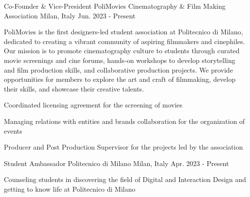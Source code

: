 

\begin{cventries}

    \cventry
      {Co-Founder \& Vice-President} %
      {PoliMovies Cinematography \& Film Making Association} %
      {Milan, Italy} %
      {Jun. 2023 - Present} %
      {
        \begin{cvitems} %
          {PoliMovies is the first designers-led student association at Politecnico di Milano, \\dedicated to creating a vibrant community of aspiring filmmakers and cinephiles. \\Our mission is to promote cinematography culture to students through curated movie screenings and cine forums, hands-on workshops to develop storytelling and film production skills, and collaborative production projects. We provide opportunities for members to explore the art and craft of filmmaking, develop their skills, and showcase their creative talents.}
          \item {}
          \item {Coordinated licensing agreement for the screening of movies}
          \item {Managing relations with entities and brands collaboration for the organization of events}
          \item {Producer and Post Production Supervisor for the projects led by the association}
        \end{cvitems}
      }
  
    \cventry
      {Student Ambassador} %
      {Politecnico di Milano} %
      {Milan, Italy} %
      {Apr. 2023 - Present} %
      {
        \begin{cvitems} %
          \item {Counseling students in discovering the field of Digital and Interaction Design and getting to know life at Politecnico di Milano}
        \end{cvitems}
      }
  

\end{cventries}
